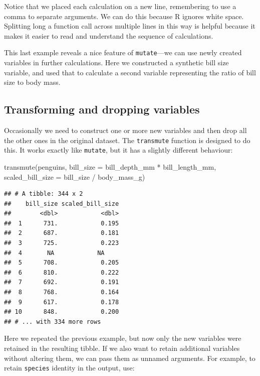 \documentclass[
]{book}
\newenvironment{Shaded}{\begin{snugshade}}{\end{snugshade}}
\newcommand{\AttributeTok}[1]{\textcolor[rgb]{0.77,0.63,0.00}{#1}}
\newcommand{\FunctionTok}[1]{\textcolor[rgb]{0.00,0.00,0.00}{#1}}
\newcommand{\NormalTok}[1]{#1}
\newcommand{\SpecialCharTok}[1]{\textcolor[rgb]{0.00,0.00,0.00}{#1}}
\begin{document}
Notice that we placed each calculation on a new line, remembering to use a comma to separate arguments. We can do this because R ignores white space. Splitting long a function call across multiple lines in this way is helpful because it makes it easier to read and understand the sequence of calculations.

This last example reveals a nice feature of \texttt{mutate}---we can use newly created variables in further calculations. Here we constructed a synthetic bill size variable, and used that to calculate a second variable representing the ratio of bill size to body mass.

\hypertarget{transforming-and-dropping-variables}{%
\subsection{Transforming and dropping variables}\label{transforming-and-dropping-variables}}

Occasionally we need to construct one or more new variables and then drop all the other ones in the original dataset. The \texttt{transmute} function is designed to do this. It works exactly like \texttt{mutate}, but it has a slightly different behaviour:

\begin{Shaded}
\begin{Highlighting}[]
\FunctionTok{transmute}\NormalTok{(penguins, }
          \AttributeTok{bill\_size =}\NormalTok{ bill\_depth\_mm }\SpecialCharTok{*}\NormalTok{ bill\_length\_mm,}
          \AttributeTok{scaled\_bill\_size =}\NormalTok{ bill\_size }\SpecialCharTok{/}\NormalTok{ body\_mass\_g)}
\end{Highlighting}
\end{Shaded}

\begin{verbatim}
## # A tibble: 344 x 2
##    bill_size scaled_bill_size
##        <dbl>            <dbl>
##  1      731.            0.195
##  2      687.            0.181
##  3      725.            0.223
##  4       NA            NA    
##  5      708.            0.205
##  6      810.            0.222
##  7      692.            0.191
##  8      768.            0.164
##  9      617.            0.178
## 10      848.            0.200
## # ... with 334 more rows
\end{verbatim}

Here we repeated the previous example, but now only the new variables were retained in the resulting tibble. If we also want to retain additional variables without altering them, we can pass them as unnamed arguments. For example, to retain \texttt{species} identity in the output, use:
\end{document}
